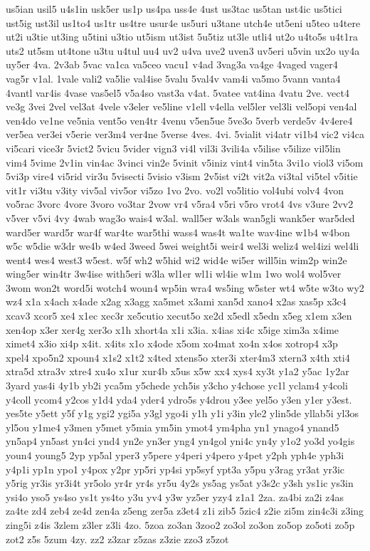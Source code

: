 {us5ian
usil5
u4s1in
usk5er
us1p
us4pa
uss4e
4ust
us3tac
us5tan
ust4ic
us5tici
ust5ig
ust3il
us1to4
us1tr
us4tre
usur4e
us5uri
u3tane
utch4e
ut5eni
u5teo
u4tere
ut2i
u3tie
ut3ing
u5tini
u3tio
ut5ism
ut3ist
5u5tiz
ut3le
utli4
ut2o
u4to5s
u4t1ra
uts2
ut5sm
ut4tone
u3tu
u4tul
uu4
uv2
u4va
uve2
uven3
uv5eri
u5vin
ux2o
uy4a
uy5er
4va.
2v3ab
5vac
va1ca
va5ceo
vacu1
v4ad
3vag3a
va4ge
4vaged
vager4
vag5r
v1al.
1vale
vali2
va5lie
val4ise
5valu
5val4v
vam4i
va5mo
5vann
vanta4
4vantl
var4is
4vase
vas5el5
v5a4so
vast3a
v4at.
5vatee
vat4ina
4vatu
2ve.
vect4
ve3g
3vei
2vel
vel3at
4vele
v3eler
ve5line
v1ell
v4ella
vel5ler
vel3li
vel5opi
ven4al
ven4do
ve1ne
ve5nia
vent5o
ven4tr
4venu
v5en5ue
5ve3o
5verb
verde5v
4v4ere4
ver5ea
ver3ei
v5erie
ver3m4
ver4ne
5verse
4ves.
4vi.
5vialit
vi4atr
vi1b4
vic2
vi4ca
vi5cari
vice3r
5vict2
5vicu
5vider
vign3
vi4l
vil3i
3vili4a
v5ilise
v5ilize
vil5lin
vim4
5vime
2v1in
vin4ac
3vinci
vin2e
5vinit
v5iniz
vint4
vin5ta
3vi1o
viol3
vi5om
5vi3p
vire4
vi5rid
vir3u
5visecti
5visio
v3ism
2v5ist
vi2t
vit2a
vi3tal
vi5tel
v5itie
vit1r
vi3tu
v3ity
viv5al
viv5or
vi5zo
1vo
2vo.
vo2l
vo5litio
vol4ubi
volv4
4von
vo5rac
3vorc
4vore
3voro
vo3tar
2vow
vr4
v5ra4
v5ri
v5ro
vrot4
4vs
v3ure
2vv2
v5ver
v5vi
4vy
4wab
wag3o
wais4
w3al.
wall5er
w3als
wan5gli
wank5er
war5ded
ward5er
ward5r
war4f
war4te
war5thi
wass4
was4t
wa1te
wav4ine
w1b4
w4bon
w5c
w5die
w3dr
we4b
w4ed
3weed
5wei
weight5i
weir4
wel3i
weliz4
wel4izi
wel4li
went4
wes4
west3
w5est.
w5f
wh2
w5hid
wi2
wid4e
wi5er
will5in
wim2p
win2e
wing5er
win4tr
3w4ise
with5eri
w3la
wl1er
wl1i
wl4ie
w1m
1wo
wol4
wol5ver
3wom
won2t
word5i
wotch4
woun4
wp5in
wra4
ws5ing
w5ster
wt4
w5te
w3to
wy2
wz4
x1a
x4ach
x4ade
x2ag
x3agg
xa5met
x3ami
xan5d
xano4
x2as
xas5p
x3c4
xcav3
xcor5
xe4
x1ec
xec3r
xe5cutio
xecut5o
xe2d
x5edl
x5edn
x5eg
x1em
x3en
xen4op
x3er
xer4g
xer3o
x1h
xhort4a
x1i
x3ia.
x4ias
xi4c
x5ige
xim3a
x4ime
ximet4
x3io
xi4p
x4it.
x4its
x1o
x4ode
x5om
xo4mat
xo4n
x4os
xotrop4
x3p
xpel4
xpo5n2
xpoun4
x1s2
x1t2
x4ted
xtens5o
xter3i
xter4m3
xtern3
x4th
xti4
xtra5d
xtra3v
xtre4
xu4o
x1ur
xur4b
x5us
x5w
xx4
xys4
xy3t
y1a2
y5ac
1y2ar
3yard
yas4i
4y1b
yb2i
yca5m
y5chede
ych5is
y3cho
y4chose
yc1l
yclam4
y4coli
y4coll
ycom4
y2cos
y1d4
yda4
yder4
ydro5s
y4drou
y3ee
yel5o
y3en
y1er
y3est.
yes5te
y5ett
y5f
y1g
ygi2
ygi5a
y3gl
ygo4i
y1h
y1i
y3in
yle2
ylin5de
yllab5i
yl3os
yl5ou
y1me4
y3men
y5met
y5mia
ym5in
ymot4
ym4pha
yn1
ynago4
ynand5
yn5ap4
yn5ast
yn4ci
ynd4
yn2e
yn3er
yng4
yn4gol
yni4c
yn4y
y1o2
yo3d
yo4gis
youn4
young5
2yp
yp5al
yper3
y5pere
y4peri
y4pero
y4pet
y2ph
yph4e
yph3i
y4p1i
yp1n
ypo1
y4pox
y2pr
yp5ri
yp4si
yp5syf
ypt3a
y5pu
y3rag
yr3at
yr3ic
y5rig
yr3is
yr3i4t
yr5olo
yr4r
yr4s
yr5u
4y2s
ys5ag
ys5at
y3s2c
y3sh
ys1ic
ys3in
ysi4o
yso5
ys4so
ys1t
ys4to
y3u
yv4
y3w
yz5er
yzy4
z1a1
2za.
za4bi
za2i
z4as
za4te
zd4
zeb4
ze4d
zen4a
z5eng
zer5a
z3et4
z1i
zib5
5zic4
z2ie
zi5m
zin4c3i
z3ing
zing5i
z4is
3zlem
z3ler
z3li
4zo.
5zoa
zo3an
3zoo2
zo3ol
zo3on
zo5op
zo5oti
zo5p
zot2
z5s
5zum
4zy.
zz2
z3zar
z5zas
z3zie
zzo3
z5zot
}
